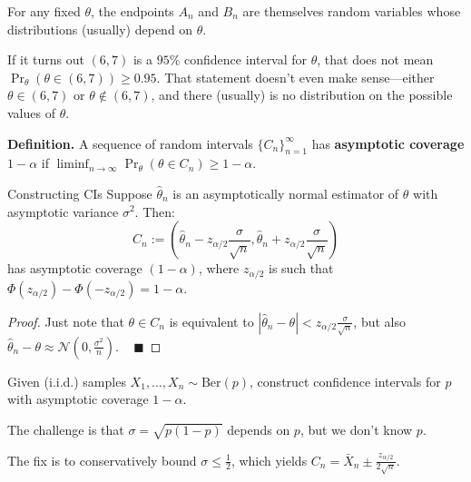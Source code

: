 \begin{remark}
    For any fixed $\theta$, the endpoints $A_n$ and $B_n$ are themselves
    random variables whose distributions (usually) depend on $\theta$.

    If it turns out $(6, 7)$ is a $95\%$ confidence interval for $\theta$,
    that does not mean $\Pr_{\theta}(\theta \in (6, 7)) \geq 0.95$.
    That statement doesn't even make sense---either $\theta \in (6, 7)$
    or $\theta \not \in (6, 7)$, and there (usually) is no distribution on
    the possible values of $\theta$.
\end{remark}

\textbf{Definition.} A sequence of random intervals
$\{C_n\}_{n = 1}^{\infty}$ has \textbf{asymptotic coverage} $1 - \alpha$
if $\liminf_{n \to \infty} \Pr_{\theta}(\theta \in C_n) \geq 1 - \alpha$.

\begin{theorem}{Constructing CIs}
    Suppose $\hat{\theta}_n$ is an asymptotically normal estimator of $\theta$
    with asymptotic variance $\sigma^2$.  Then:
    \[ C_n := \left( \hat{\theta}_n - z_{\alpha / 2} \frac{\sigma}{\sqrt{n}},
    \hat{\theta}_n + z_{\alpha / 2} \frac{\sigma}{\sqrt{n}} \right) \]
    has asymptotic coverage $(1 - \alpha)$, where $z_{\alpha / 2}$
    is such that $\Phi(z_{\alpha / 2}) - \Phi(-z_{\alpha / 2}) = 1 - \alpha$.
\end{theorem}

\begin{proof}
    Just note that $\theta \in C_n$ is equivalent to
    $|\hat{\theta}_n - \theta| < z_{\alpha / 2} \frac{\sigma}{\sqrt{n}}$,
    but also $\hat{\theta}_n - \theta \approx \mathcal{N}(0, \frac{\sigma^2}{n})$.
    ~ $\blacksquare$
\end{proof}

\begin{problem}
    Given (i.i.d.) samples $X_1, \dots, X_n \sim \mathrm{Ber}(p)$,
    construct confidence intervals for $p$ with asymptotic coverage $1 - \alpha$.
\end{problem}

\begin{solution}
    The challenge is that $\sigma = \sqrt{p(1 - p)}$ depends on $p$,
    but we don't know $p$.
    
    The fix is to conservatively bound $\sigma \leq \frac{1}{2}$, which yields
    $C_n = \bar{X}_n \pm \frac{z_{\alpha / 2}}{2\sqrt{n}}$.
\end{solution}

